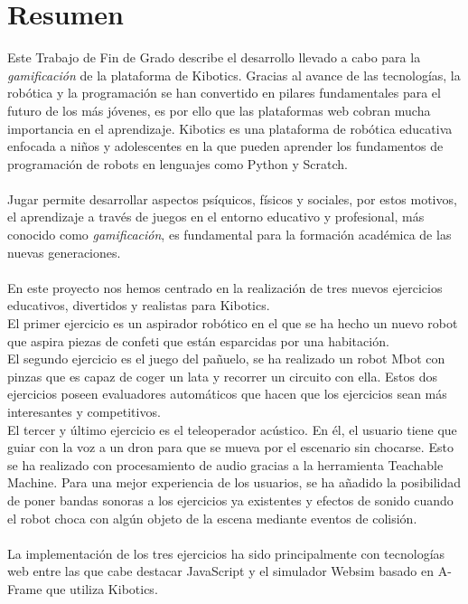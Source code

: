 \newpage
\thispagestyle{plain}			%
\setlength{\parskip}{0pt plus 1.0pt}
\section*{Resumen}
Este Trabajo de Fin de Grado describe el desarrollo llevado a cabo para la \textit{gamificación} de la plataforma de Kibotics.  
Gracias al avance de las tecnologías, la robótica y la programación se han convertido en pilares fundamentales para el futuro de los más jóvenes, es por ello que las plataformas web cobran mucha importancia en el aprendizaje. Kibotics es una plataforma de robótica educativa enfocada a niños y adolescentes en la que pueden aprender los fundamentos de programación de robots en lenguajes como Python y Scratch. 
\\
\\
Jugar permite desarrollar aspectos psíquicos, físicos y sociales, por estos motivos, el aprendizaje a través de juegos en el entorno educativo y profesional, más conocido como \textit{gamificación}, es fundamental para la formación académica de las nuevas generaciones.
 \\
 \\
En este proyecto nos hemos centrado en la realización de tres nuevos ejercicios educativos, divertidos y realistas para Kibotics.
\\
El primer ejercicio  es un aspirador robótico en el que se ha hecho un nuevo robot que aspira piezas de confeti que están esparcidas por una habitación.
\\
El segundo  ejercicio  es el juego del pañuelo, se ha realizado un robot Mbot con pinzas que es capaz de coger un lata y recorrer un circuito con ella. 
Estos dos ejercicios poseen evaluadores automáticos que hacen que los ejercicios sean más interesantes y competitivos.
\\
El tercer y último ejercicio es el teleoperador acústico. En él,  el usuario tiene que guiar con la voz a un dron para que se mueva por el escenario sin chocarse. Esto se ha realizado con procesamiento de audio gracias a la herramienta Teachable Machine.
Para una mejor experiencia de los usuarios, se ha  añadido la posibilidad de poner bandas sonoras a los ejercicios ya existentes y efectos de sonido cuando el robot choca con algún objeto de la escena mediante eventos de colisión.
\\
\\
La implementación de los tres ejercicios ha sido principalmente con tecnologías web entre las que cabe destacar JavaScript y el simulador Websim basado en A-Frame que utiliza Kibotics.



